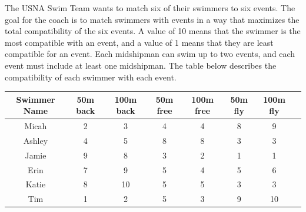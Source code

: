 \documentclass[12pt]{exam}
\begin{document}
\begin{questions}





\question The USNA Swim Team wants to match six of their swimmers to six events. The goal for the coach is to match swimmers with events in a way that maximizes the total compatibility of the six events. A value of 10 means that the swimmer is the most compatible with an event, and a value of 1 means that they are least compatible for an event. Each midshipman can swim up to two events, and each event must include at least one midshipman. The table below describes the compatibility of each swimmer with each event. 

\begin{center}
\begin{tabular}{c|ccccccc} 
Swimmer Name & 50m back & 100m back & 50m free & 100m free & 50m fly & 100m fly &  \\\hline
Micah & 2 & 3 & 4 & 4 & 8 & 9  \\
Ashley & 4 & 5 & 8 & 8 & 3 & 3 \\
Jamie & 9 & 8 & 3 & 2 & 1 & 1\\
Erin & 7 & 9& 5 & 4& 5 & 6\\
Katie & 8 & 10& 5 & 5& 3 & 3\\
Tim & 1 & 2& 5 & 3& 9 & 10
\end{tabular}
\end{center}


\end{questions}
\end{document}
